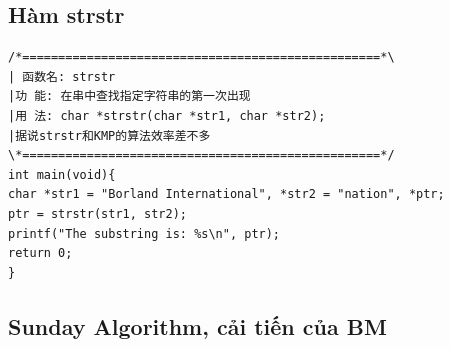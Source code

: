 \documentclass[11pt]{article}
\begin{document}
\subsection{Hàm strstr}

\begingroup
\scriptsize
\begin{verbatim}
/*==================================================*\
| 函数名: strstr
|功 能: 在串中查找指定字符串的第一次出现
|用 法: char *strstr(char *str1, char *str2);
|据说strstr和KMP的算法效率差不多
\*==================================================*/
int main(void){
char *str1 = "Borland International", *str2 = "nation", *ptr;
ptr = strstr(str1, str2);
printf("The substring is: %s\n", ptr);
return 0;
}
\end{verbatim}
\endgroup

\subsection{Sunday Algorithm, cải tiến của BM}
\end{document}

